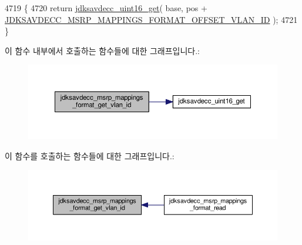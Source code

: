 \begin{DoxyCode}
4719 \{
4720     \textcolor{keywordflow}{return} \hyperlink{group__endian_ga3fbbbc20be954aa61e039872965b0dc9}{jdksavdecc\_uint16\_get}( base, pos + 
      \hyperlink{group__msrp__mappings__format_gac89827632a3bb8e747f9c1d7b1be3faa}{JDKSAVDECC\_MSRP\_MAPPINGS\_FORMAT\_OFFSET\_VLAN\_ID} );
4721 \}
\end{DoxyCode}


이 함수 내부에서 호출하는 함수들에 대한 그래프입니다.\+:
\nopagebreak
\begin{figure}[H]
\begin{center}
\leavevmode
\includegraphics[width=350pt]{group__msrp__mappings__format_ga2aae8fb990633570010e5bfb863e1b93_cgraph}
\end{center}
\end{figure}




이 함수를 호출하는 함수들에 대한 그래프입니다.\+:
\nopagebreak
\begin{figure}[H]
\begin{center}
\leavevmode
\includegraphics[width=350pt]{group__msrp__mappings__format_ga2aae8fb990633570010e5bfb863e1b93_icgraph}
\end{center}
\end{figure}


